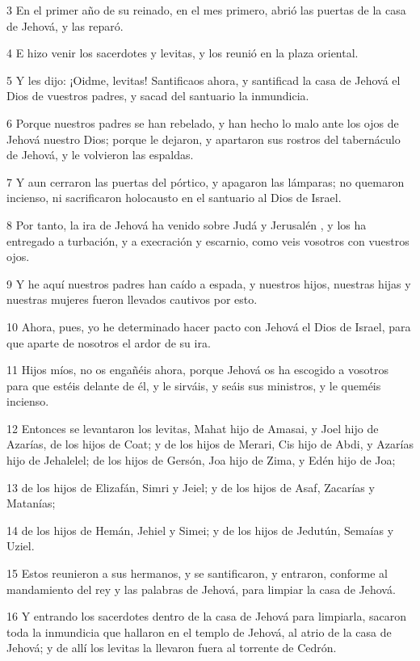 \par 3 En el primer año de su reinado, en el mes primero, abrió las puertas de la casa de Jehová, y las reparó.
\par 4 E hizo venir los sacerdotes y levitas, y los reunió en la plaza oriental.
\par 5 Y les dijo: ¡Oidme, levitas! Santificaos ahora, y santificad la casa de Jehová el Dios de vuestros padres, y sacad del santuario la inmundicia.
\par 6 Porque nuestros padres se han rebelado, y han hecho lo malo ante los ojos de Jehová nuestro Dios; porque le dejaron, y apartaron sus rostros del tabernáculo de Jehová, y le volvieron las espaldas.
\par 7 Y aun cerraron las puertas del pórtico, y apagaron las lámparas; no quemaron incienso, ni sacrificaron holocausto en el santuario al Dios de Israel.
\par 8 Por tanto, la ira de Jehová ha venido sobre Judá y Jerusalén , y los ha entregado a turbación, y a execración y escarnio, como veis vosotros con vuestros ojos. 
\par 9 Y he aquí nuestros padres han caído a espada, y nuestros hijos, nuestras hijas y nuestras mujeres fueron llevados cautivos por esto.
\par 10 Ahora, pues, yo he determinado hacer pacto con Jehová el Dios de Israel, para que aparte de nosotros el ardor de su ira.
\par 11 Hijos míos, no os engañéis ahora, porque Jehová os ha escogido a vosotros para que estéis delante de él, y le sirváis, y seáis sus ministros, y le queméis incienso.
\par 12 Entonces se levantaron los levitas, Mahat hijo de Amasai, y Joel hijo de Azarías, de los hijos de Coat; y de los hijos de Merari, Cis hijo de Abdi, y Azarías hijo de Jehalelel; de los hijos de Gersón, Joa hijo de Zima, y Edén hijo de Joa;
\par 13 de los hijos de Elizafán, Simri y Jeiel; y de los hijos de Asaf, Zacarías y Matanías;
\par 14 de  los hijos de Hemán, Jehiel y Simei; y de los hijos de Jedutún, Semaías y Uziel.
\par 15 Estos reunieron a sus hermanos, y se santificaron, y entraron, conforme al mandamiento del rey y las palabras de Jehová, para limpiar la casa de Jehová.
\par 16 Y entrando los sacerdotes dentro de la casa de Jehová para limpiarla, sacaron toda la inmundicia que hallaron en el templo de Jehová, al atrio de la casa de Jehová; y de allí los levitas la llevaron fuera al torrente de Cedrón.
